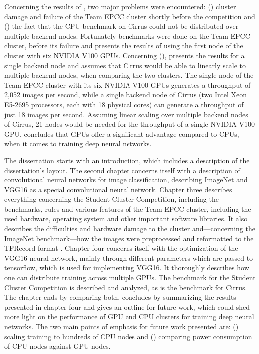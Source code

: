 \documentclass{article}
\begin{document}
Concerning the results of \citet{nita_2018}, two major
problems were encountered: () cluster
damage and failure of the Team EPCC cluster shortly before
the competition and () the fact that the CPU
benchmark on Cirrus could not be distributed over multiple
backend nodes.
Fortunately benchmarks were done on the Team EPCC cluster,
before its failure and \citet{nita_2018} presents the
results of using the first node of the cluster with six
NVIDIA V100 GPUs.
Concerning (), \citet{nita_2018} presents
the results for a single backend node and assumes that
Cirrus would be able to linearly scale to multiple backend
nodes, when comparing the two clusters.
The single node of the Team EPCC cluster with its six
NVIDIA V100 GPUs generates a throughput of 2,052 images per
second, while a single backend node of Cirrus (two Intel
Xeon E5-2695 processors, each with 18 physical cores) can
generate a throughput of just 18 images per second.
Assuming linear scaling over multiple backend nodes of
Cirrus, 21 nodes would be needed for the throughput of a
single NVIDIA V100 GPU.
\citet{nita_2018} concludes that GPUs offer a significant
advantage compared to CPUs, when it comes to training
deep neural networks.

The dissertation starts with an introduction, which
includes a description of the dissertation's layout.
The second chapter concerns itself with a description of
convolutional neural networks for image classification,
describing ImageNet and VGG16 as a special convolutional
neural network.
Chapter three describes everything concerning the Student
Cluster Competition, including the benchmarks, rules and
various features of the Team EPCC cluster, including the
used hardware, operating system and other important
software libraries.
It also describes the difficulties and hardware damage to
the cluster and---concerning the ImageNet benchmark---how
the images were preprocessed and reformatted to the
TFRecord format \citep{tf2015}.
Chapter four concerns itself with the optimization of the
VGG16 neural network, mainly through different parameters
which are passed to tensorflow, which is used for
implementing VGG16.
It thoroughly describes how one can distribute training
across multiple GPUs.
The benchmark for the Student Cluster Competition is
described and analyzed, as is the benchmark for Cirrus.
The chapter ends by comparing both.
\citet{nita_2018} concludes by summarizing the results
presented in chapter four and gives an outline for future
work, which could shed more light on the performance of
GPU and CPU clusters for training deep neural networks.
The two main points of emphasis for future work presented
are: () scaling training to hundreds of
CPU nodes \citep[see e.g.][for distributing training onto
multiple CPUs]{you2017} and ()
comparing power consumption of CPU nodes against GPU nodes.
\end{document}
